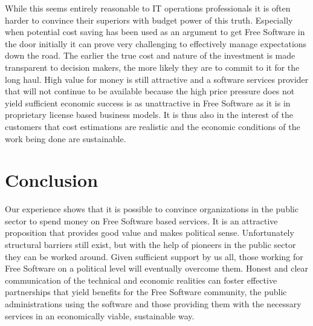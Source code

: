 While this seems entirely reasonable to IT operations
professionals it is often harder to convince their superiors with budget power
of this truth. Especially when potential cost saving has been used as an
argument to get Free Software in the door initially it can prove very
challenging to effectively manage expectations down the road. The earlier the
true cost and nature of the investment is made transparent to decision makers,
the more likely they are to commit to it for the long haul. 
High value for money is still attractive and a software services provider that will
not continue to be available because the high price pressure does not yield
sufficient economic success is as unattractive in Free Software as it is in
proprietary license based business models. It is thus also in the interest of the
customers that cost estimations are realistic and the economic conditions of the
work being done are sustainable.

\section*{Conclusion}

Our experience shows that it is possible to convince organizations in
the public sector to spend money on Free Software based services. It is
an attractive proposition that provides good value and makes political
sense. Unfortunately structural barriers still exist, but with the help
of pioneers in the public sector they can be worked around. Given
sufficient support by us all, those working for Free Software on a political
level will eventually overcome them. Honest and clear
communication of the technical and economic realities can foster
effective partnerships that yield benefits for the Free Software community,
the public administrations using the software and those providing them
with the necessary services in an economically viable, sustainable way.

